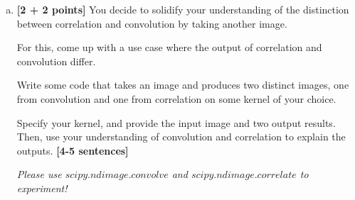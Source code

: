 \documentclass[11pt]{article}
\begin{document}
\begin{enumerate}[(a)]

    \pagebreak
    \item \textbf{[2 + 2 points]}
    You decide to solidify your understanding of the distinction between correlation and convolution by taking another image.
    
    \begin{tcolorbox}[colback=orange!5!white,colframe=orange!75!black]
    For this, come up with a use case where the output of correlation and convolution differ.
    
    Write some code that takes an image and produces two distinct images, one from convolution and one from correlation on some kernel of your choice. 
    
    Specify your kernel, and provide the input image and two output results. Then, use your understanding of convolution and correlation to explain the outputs. \textbf{[4-5 sentences]}
    \end{tcolorbox}
    
    \emph{Please use \href{https://docs.scipy.org/doc/scipy/reference/generated/scipy.ndimage.convolve.html}{$scipy.ndimage.convolve$} and \href{https://docs.scipy.org/doc/scipy/reference/generated/scipy.ndimage.correlate.html}{$scipy.ndimage.correlate$} to experiment!}
    


\end{enumerate}
\end{document}
